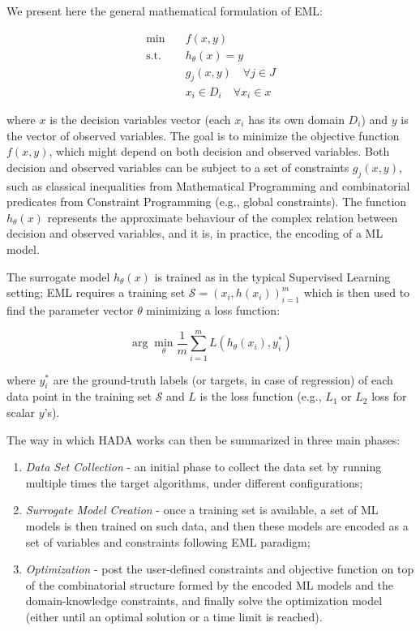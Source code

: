 \documentclass[a4paper,singleside,12pt]{report} %
\begin{document}
We present here the general mathematical formulation of EML:

\begin{align}
    \min \quad & f(x, y) \label{eq:objective} \\
    \text{s.t.} \quad & h_{\theta}(x) = y \label{eq:surrogate} \\
    & g_j(x, y) \quad \forall j \in J \label{eq:constraints} \\
    & x_i \in D_i \quad \forall x_i \in x \label{eq:domain}
\end{align}

where $x$ is the decision variables vector (each $x_i$ has its own domain $D_i$) and $y$ is the vector of observed variables.
 The goal is to minimize the objective function $f(x,y)$, which might depend on both decision and observed variables. Both 
 decision and observed variables can be subject to a set of constraints $g_j(x,y)$, such as classical inequalities from 
 Mathematical Programming and combinatorial predicates from Constraint Programming (e.g., global constraints). The function 
 $h_{\theta}(x)$ represents the approximate behaviour of the complex relation between decision and observed variables, and it 
 is, in practice, the encoding of a ML model.

The surrogate model $h_{\theta}(x)$ is trained as in the typical Supervised Learning setting; EML requires a training set 
$\mathcal{S} = (x_i, h(x_i))_{i=1}^{m}$ which is then used to find the parameter vector $\theta$ minimizing a loss function:

\begin{equation}
    \arg\min_{\theta} \frac{1}{m} \sum_{i=1}^{m} L(h_{\theta}(x_i), y_i^*)
\end{equation}

where $y_i^*$ are the ground-truth labels (or targets, in case of regression) of each data point in the training set 
$\mathcal{S}$ and $L$ is the loss function (e.g., $L_1$ or $L_2$ loss for scalar $y$'s).

The way in which HADA works can then be summarized in three main phases:
\begin{enumerate}
    \item \textit{Data Set Collection} - an initial phase to collect the data set by running multiple times the target algorithms, 
    under different configurations;
    \item \textit{Surrogate Model Creation} - once a training set is available, a set of ML models is then trained on such data, and 
    then these models are encoded as a set of variables and constraints following EML paradigm;
    \item \textit{Optimization} - post the user-defined constraints and objective function on top of the combinatorial structure
    formed by the encoded ML models and the domain-knowledge constraints, and finally solve the optimization model 
    (either until an optimal solution or a time limit is reached).
\end{enumerate}
\end{document}
